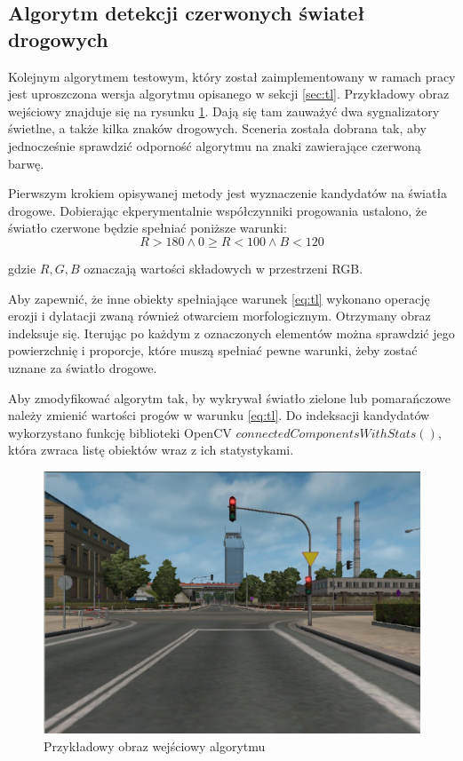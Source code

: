 \subsection{Algorytm detekcji czerwonych świateł drogowych}

Kolejnym algorytmem testowym, który został zaimplementowany w ramach pracy jest uproszczona wersja algorytmu opisanego w sekcji \ref{sec:tl}. Przykładowy obraz wejściowy znajduje się na rysunku \ref{fig:alg2_input}. Dają się tam zauważyć dwa sygnalizatory świetlne, a także kilka znaków drogowych. Sceneria została dobrana tak, aby jednocześnie sprawdzić odporność algorytmu na znaki zawierające czerwoną barwę.

Pierwszym krokiem opisywanej metody jest wyznaczenie kandydatów na światła drogowe. Dobierając ekperymentalnie współczynniki progowania ustalono, że światło czerwone będzie spełniać poniższe warunki:
\begin{equation}
\label{eq:tl}
R>180 \wedge 0 \geq R<100 \wedge B < 120
\end{equation}

gdzie $R, G, B$ oznaczają wartości składowych w przestrzeni RGB.

Aby zapewnić, że inne obiekty spełniające warunek \ref{eq:tl} wykonano operację erozji i dylatacji zwaną również otwarciem morfologicznym. Otrzymany obraz indeksuje się. Iterując po każdym z oznaczonych elementów można sprawdzić jego powierzchnię i proporcje, które muszą spełniać pewne warunki, żeby zostać uznane za światło drogowe.

Aby zmodyfikować algorytm tak, by wykrywał światło zielone lub pomarańczowe należy zmienić wartości progów w warunku \ref{eq:tl}. Do indeksacji kandydatów wykorzystano funkcję biblioteki OpenCV $connectedComponentsWithStats()$, która zwraca listę obiektów wraz z ich statystykami.

\begin{figure}
  \centering
  \includegraphics[width=13cm]{img/alg2_input.jpg}
  \caption{Przykładowy obraz wejściowy algorytmu}
  \label{fig:alg2_input}
\end{figure}

